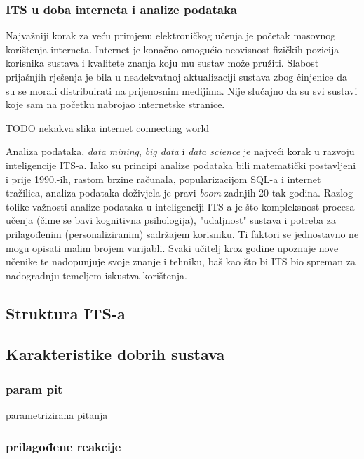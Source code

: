 \documentclass[times, utf8, zavrsni]{fer}
\begin{document}
\subsubsection{ITS u doba interneta i analize podataka}
Najvažniji korak za veću primjenu elektroničkog učenja je početak masovnog korištenja interneta. Internet je konačno omogućio neovisnost fizičkih pozicija korisnika sustava i kvalitete znanja koju mu sustav može pružiti. Slabost prijašnjih rješenja je bila u neadekvatnoj aktualizaciji sustava zbog činjenice da su se morali distribuirati na prijenosnim medijima. Nije slučajno da su svi sustavi koje sam na početku nabrojao internetske stranice.
\par TODO nekakva slika internet connecting world
\par
Analiza podataka, \textit{data mining}, \textit{big data} i \textit{data science} je najveći korak u razvoju inteligencije ITS-a. Iako su principi analize podataka bili matematički postavljeni i prije 1990.-ih, rastom brzine računala, popularizacijom SQL-a i internet tražilica, analiza podataka doživjela je pravi \textit{boom} zadnjih 20-tak godina. Razlog tolike važnosti analize podataka u inteligenciji ITS-a je što kompleksnost procesa učenja (čime se bavi kognitivna psihologija), "udaljnost" sustava i potreba za prilagođenim (personaliziranim) sadržajem korisniku. Ti faktori se jednostavno ne mogu opisati malim brojem varijabli. Svaki učitelj kroz godine upoznaje nove učenike te nadopunjuje svoje znanje i tehniku, baš kao što bi ITS bio spreman za nadogradnju temeljem iskustva korištenja.

\subsection{Struktura ITS-a}

\subsection{Karakteristike dobrih sustava}

\subsubsection*{param pit} parametrizirana pitanja

\subsubsection{prilagođene reakcije}
\end{document}

